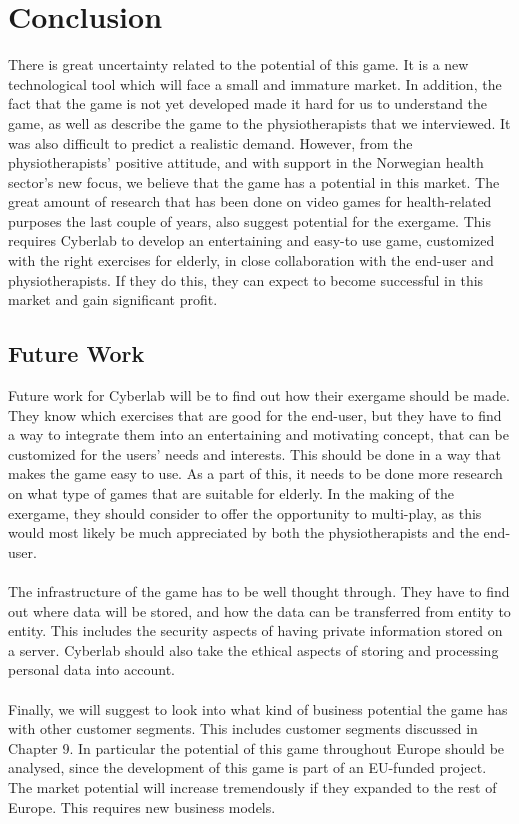 \chapter{Conclusion}
There is great uncertainty related to the potential of this game. It is a new technological tool which will face a small and immature market. In addition, the fact that the game is not yet developed made it hard for us to understand the game, as well as describe the game to the physiotherapists that we interviewed. It was also difficult to predict a realistic demand. However, from the physiotherapists' positive attitude, and with support in the Norwegian health sector's new focus, we believe that the game has a potential in this market. The great amount of research that has been done on video games for health-related purposes the last couple of years, also suggest potential for the exergame. This requires Cyberlab to develop an entertaining and easy-to use game, customized with the right exercises for elderly, in close collaboration with the end-user and physiotherapists. If they do this, they can expect to become successful in this market and gain significant profit.  
\section{Future Work}
Future work for Cyberlab will be to find out how their exergame should be made. They know which exercises that are good for the end-user, but they have to find a way to integrate them into an entertaining and motivating concept, that can be customized for the users' needs and interests.  This should be done in a way that makes the game easy to use. As a part of this, it needs to be done more research on what type of games that are suitable for elderly.  In the making of the exergame, they should consider to offer the opportunity to multi-play, as this would most likely be much appreciated by both the physiotherapists and the end-user. \\ \\
The infrastructure of the game has to be well thought through. They have to find out where data will be stored, and how the data can be transferred from entity to entity. This includes the security aspects of having private information stored on a server. Cyberlab should also take the ethical aspects of storing and processing personal data into account. \\ \\
Finally, we will suggest to look into what kind of business potential the game has with other customer segments. This includes customer segments discussed in Chapter 9. In particular the potential of this game throughout Europe should be analysed, since the development of this game is part of an EU-funded project. The market potential will increase tremendously if they expanded to the rest of Europe. This requires new business models. \\ \\